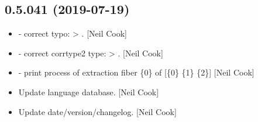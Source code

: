 \documentclass[a4paper,10pt,english]{report}
\begin{document}
\subsection{0.5.041 (2019-07-19)}
\label{\detokenize{misc/changelog:id100}}\begin{itemize}
\item {} 
 - correct typo:  \textendash{}\textgreater{} .
{[}Neil Cook{]}

\item {} 
 - correct corrtype2 type:
 \textendash{}\textgreater{} . {[}Neil Cook{]}

\item {} 
 - print process of extraction fiber \{0\} of {[}\{0\}
\{1\} \{2\}{]} {[}Neil Cook{]}

\item {} 
Update language database. {[}Neil Cook{]}

\item {} 
Update date/version/changelog. {[}Neil Cook{]}

\end{itemize}
\end{document}
